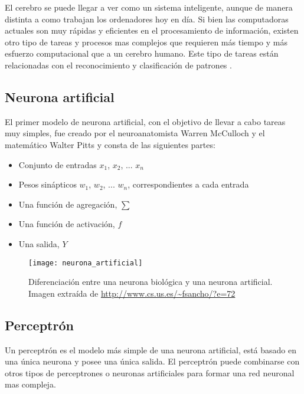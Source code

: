 El cerebro se puede llegar a ver como un sistema inteligente, aunque de manera distinta a como trabajan los ordenadores hoy en día. Si bien las computadoras actuales son muy rápidas y eficientes en el procesamiento de información, existen otro tipo de tareas y procesos mas complejos que requieren más tiempo y más esfuerzo computacional que a un cerebro humano. Este tipo de tareas están relacionadas con el reconocimiento y clasificación de patrones \cite{redes_neuronales}.

\subsection{Neurona artificial}
El primer modelo de neurona artificial, con el objetivo de llevar a cabo tareas muy simples, fue creado por el neuroanatomista Warren McCulloch y el matemático Walter Pitts y consta de las siguientes partes:

\newpage

\begin{itemize}
    \item Conjunto de entradas $x_1$, $x_2$, ... $x_n$
    \item Pesos sinápticos $w_1$, $w_2$, ... $w_n$, correspondientes a cada entrada
    \item Una función de agregación, $\sum$
    \item Una función de activación, $f$
    \item Una salida, $Y$
\end{itemize}

\FloatBarrier
\begin{figure}[!h]
\centering
\texttt{[image: neurona\_artificial]}
\caption[Diferenciación entre una neurona biológica y una neurona artificial]{Diferenciación entre una neurona biológica y una neurona artificial.
\newline
Imagen extraída de \url{http://www.cs.us.es/~fsancho/?e=72}}
\label{fig}
\end{figure}
\FloatBarrier

\subsection{Perceptrón}
 Un perceptrón es el modelo más simple de una neurona artificial, está basado en una única neurona y posee una única salida. El perceptrón puede combinarse con otros tipos de perceptrones o neuronas artificiales para formar una red neuronal mas compleja.
 
